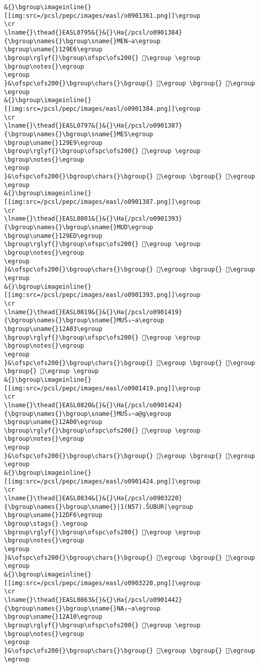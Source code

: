\begin{verbatim}
&{}\bgroup\imageinline{}[[img:src=/pcsl/pepc/images/easl/o0901361.png]]\egroup
\cr
\lname{}\thead{}EASL0795&{}&{}\Ha{/pcsl/o0901384}{\bgroup\names{}\bgroup\sname{}MEN∼a\egroup
\bgroup\uname{}129E6\egroup
\bgroup\rglyf{}\bgroup\ofspc\ofs200{} 𒧦\egroup \egroup
\bgroup\notes{}\egroup
\egroup
}&\ofspc\ofs200{}\bgroup\chars{}\bgroup{} 𒧥\egroup \bgroup{} 𒧦\egroup \egroup
&{}\bgroup\imageinline{}[[img:src=/pcsl/pepc/images/easl/o0901384.png]]\egroup
\cr
\lname{}\thead{}EASL0797&{}&{}\Ha{/pcsl/o0901387}{\bgroup\names{}\bgroup\sname{}MES\egroup
\bgroup\uname{}129E9\egroup
\bgroup\rglyf{}\bgroup\ofspc\ofs200{} 𒧩\egroup \egroup
\bgroup\notes{}\egroup
\egroup
}&\ofspc\ofs200{}\bgroup\chars{}\bgroup{} 𒧨\egroup \bgroup{} 𒧩\egroup \egroup
&{}\bgroup\imageinline{}[[img:src=/pcsl/pepc/images/easl/o0901387.png]]\egroup
\cr
\lname{}\thead{}EASL0801&{}&{}\Ha{/pcsl/o0901393}{\bgroup\names{}\bgroup\sname{}MUD\egroup
\bgroup\uname{}129ED\egroup
\bgroup\rglyf{}\bgroup\ofspc\ofs200{} 𒧭\egroup \egroup
\bgroup\notes{}\egroup
\egroup
}&\ofspc\ofs200{}\bgroup\chars{}\bgroup{} 𒧭\egroup \bgroup{} 𒧮\egroup \egroup
&{}\bgroup\imageinline{}[[img:src=/pcsl/pepc/images/easl/o0901393.png]]\egroup
\cr
\lname{}\thead{}EASL0819&{}&{}\Ha{/pcsl/o0901419}{\bgroup\names{}\bgroup\sname{}MUŠ₃∼a\egroup
\bgroup\uname{}12A03\egroup
\bgroup\rglyf{}\bgroup\ofspc\ofs200{} 𒨃\egroup \egroup
\bgroup\notes{}\egroup
\egroup
}&\ofspc\ofs200{}\bgroup\chars{}\bgroup{} 𒧿\egroup \bgroup{} 𒨂\egroup \bgroup{} 𒨃\egroup \egroup
&{}\bgroup\imageinline{}[[img:src=/pcsl/pepc/images/easl/o0901419.png]]\egroup
\cr
\lname{}\thead{}EASL0820&{}&{}\Ha{/pcsl/o0901424}{\bgroup\names{}\bgroup\sname{}MUŠ₃∼a@g\egroup
\bgroup\uname{}12A00\egroup
\bgroup\rglyf{}\bgroup\ofspc\ofs200{} 𒨀\egroup \egroup
\bgroup\notes{}\egroup
\egroup
}&\ofspc\ofs200{}\bgroup\chars{}\bgroup{} 𒨀\egroup \bgroup{} 𒨁\egroup \egroup
&{}\bgroup\imageinline{}[[img:src=/pcsl/pepc/images/easl/o0901424.png]]\egroup
\cr
\lname{}\thead{}EASL0834&{}&{}\Ha{/pcsl/o0903220}{\bgroup\names{}\bgroup\sname{}|1(N57).ŠUBUR|\egroup
\bgroup\uname{}12DF6\egroup
\bgroup\stags{}.\egroup
\bgroup\rglyf{}\bgroup\ofspc\ofs200{} 𒷶\egroup \egroup
\bgroup\notes{}\egroup
\egroup
}&\ofspc\ofs200{}\bgroup\chars{}\bgroup{} 𒷷\egroup \bgroup{} 𒷶\egroup \egroup
&{}\bgroup\imageinline{}[[img:src=/pcsl/pepc/images/easl/o0903220.png]]\egroup
\cr
\lname{}\thead{}EASL0863&{}&{}\Ha{/pcsl/o0901442}{\bgroup\names{}\bgroup\sname{}NA₂∼a\egroup
\bgroup\uname{}12A10\egroup
\bgroup\rglyf{}\bgroup\ofspc\ofs200{} 𒨐\egroup \egroup
\bgroup\notes{}\egroup
\egroup
}&\ofspc\ofs200{}\bgroup\chars{}\bgroup{} 𒨏\egroup \bgroup{} 𒨐\egroup \egroup

\end{verbatim}
